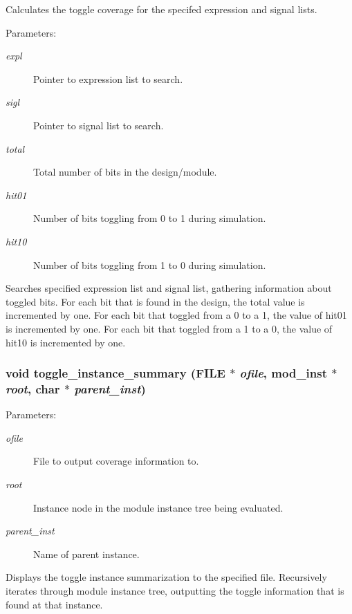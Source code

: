 Calculates the toggle coverage for the specifed expression and signal lists.

\begin{Desc}
\item[Parameters: ]\par
\begin{description}
\item[{\em 
expl}]Pointer to expression list to search. \item[{\em 
sigl}]Pointer to signal list to search. \item[{\em 
total}]Total number of bits in the design/module. \item[{\em 
hit01}]Number of bits toggling from 0 to 1 during simulation. \item[{\em 
hit10}]Number of bits toggling from 1 to 0 during simulation.\end{description}
\end{Desc}
Searches specified expression list and signal list, gathering information  about toggled bits. For each bit that is found in the design, the total value is incremented by one. For each bit that toggled from a 0 to a 1, the value of hit01 is incremented by one. For each bit that toggled from a 1 to a 0, the value of hit10 is incremented by one. 
\subsubsection{\setlength{\rightskip}{0pt plus 5cm}void toggle\_\-instance\_\-summary (FILE $\ast$ {\em ofile}, {\bf mod\_\-inst} $\ast$ {\em root}, char $\ast$ {\em parent\_\-inst})}\label{toggle_8c_a3}


\begin{Desc}
\item[Parameters: ]\par
\begin{description}
\item[{\em 
ofile}]File to output coverage information to. \item[{\em 
root}]Instance node in the module instance tree being evaluated. \item[{\em 
parent\_\-inst}]Name of parent instance.\end{description}
\end{Desc}
Displays the toggle instance summarization to the specified file. Recursively iterates through module instance tree, outputting the toggle information that is found at that instance. 
